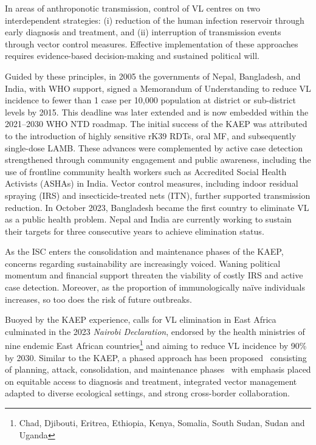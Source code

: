 
In areas of anthroponotic transmission, control of VL centres on two interdependent strategies: (i) reduction of the human infection reservoir through early diagnosis and treatment, and (ii) interruption of transmission events through vector control measures. Effective implementation of these approaches requires evidence-based decision-making and sustained political will.

Guided by these principles, in 2005 the governments of Nepal, Bangladesh, and India, with WHO support, signed a Memorandum of Understanding to reduce VL incidence to fewer than 1 case per 10,000 population at district or sub-district levels by 2015. This deadline was later extended and is now embedded within the 2021--2030 WHO NTD roadmap\cite{who_sea_elim2005, WHO_KalaAzarElimination_2015, WHO_SEA_CD_329_2021, WHO_NTDs_Roadmap_2021_2030, WHO_Global_Report_NTDs_2025}. The initial success of the KAEP was attributed to the introduction of highly sensitive rK39 RDTs, oral MF, and subsequently single-dose LAMB. These advances were complemented by active case detection strengthened through community engagement and public awareness, including the use of frontline community health workers such as Accredited Social Health Activists (ASHAs) in India\cite{das2016}. Vector control measures, including indoor residual spraying (IRS) and insecticide-treated nets (ITN), further supported transmission reduction\cite{sundar2018}. In October 2023, Bangladesh became the first country to eliminate VL as a public health problem\cite{nagi2024}. Nepal and India are currently working to sustain their targets for three consecutive years to achieve elimination status\cite{pandey2025}.

As the ISC enters the consolidation and maintenance phases of the KAEP, concerns regarding sustainability are increasingly voiced\cite{chatterjee2025}. Waning political momentum and financial support threaten the viability of costly IRS and active case detection. Moreover, as the proportion of immunologically naïve individuals increases, so too does the risk of future outbreaks\cite{lerutte2017}.

Buoyed by the KAEP experience, calls for VL elimination in East Africa\cite{alvar2021} culminated in the 2023 \textit{Nairobi Declaration}, endorsed by the health ministries of nine endemic East African countries\footnote{Chad, Djibouti, Eritrea, Ethiopia, Kenya, Somalia, South Sudan, Sudan and Uganda} and aiming to reduce VL incidence by 90\% by 2030. Similar to the KAEP, a phased approach has been proposed \textemdash\  consisting of planning, attack, consolidation, and maintenance phases \textemdash\  with emphasis placed on equitable access to diagnosis and treatment, integrated vector management adapted to diverse ecological settings, and strong cross-border collaboration\cite{WHO_nairobi_declaration, WHO_2024_VL_easternAfrica}.

